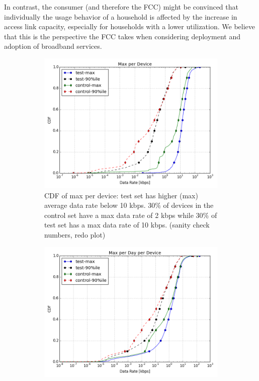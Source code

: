 In contrast, the consumer (and therefore the FCC) might be convinced that individually
the usage behavior of a household is affected by the increase in access link
capacity, especially for households with a lower utilization. We believe that this is
the perspective the FCC takes when considering deployment and adoption of broadband services.

\begin{figure}[ht!]
\begin{minipage}{0.90\linewidth}
\centering
%
\begin{subfigure}[b]{0.90\linewidth}
\includegraphics[width=\linewidth]{figures/cdf-max-per-device.png}
  \caption{CDF of max per device: test set has higher (max) average data rate below 10 kbps.  30\% of devices in the control set have a max data rate of 2 kbps while 30\% of test set has a max data rate of 10 kbps. (sanity check numbers, redo plot)}
  \label{fig:CDF-data-rate-max}
\end{subfigure}
%
\vspace{-1em}
%
\begin{subfigure}[b]{0.90\linewidth}
\includegraphics[width=\linewidth]{figures/cdf-max-per-day-per-device.png}

\end{subfigure}
\end{minipage}
\end{figure}
